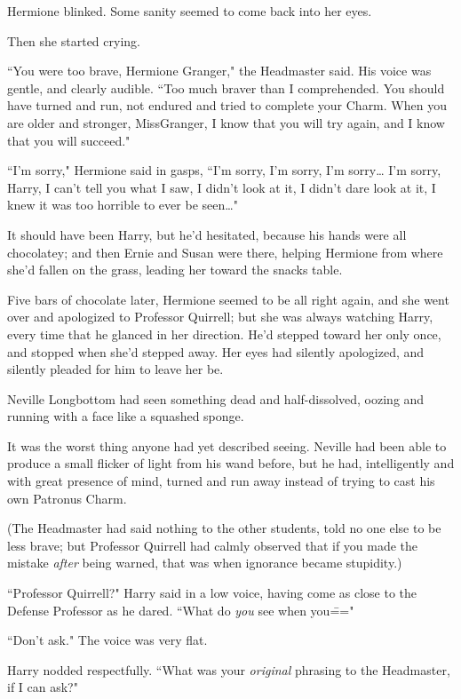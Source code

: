 Hermione blinked. Some sanity seemed to come back into her eyes.

Then she started crying.

``You were too brave, Hermione Granger," the Headmaster said. His voice was gentle, and clearly audible. ``Too much braver than I comprehended. You should have turned and run, not endured and tried to complete your Charm. When you are older and stronger, Miss\?Granger, I know that you will try again, and I know that you will succeed."

``I'm sorry," Hermione said in gasps, ``I'm sorry, I'm sorry, I'm sorry{\ldots} I'm sorry, Harry, I can't tell you what I saw, I didn't look at it, I didn't dare look at it, I knew it was too horrible to ever be seen{\ldots}"

It should have been Harry, but he'd hesitated, because his hands were all chocolatey; and then Ernie and Susan were there, helping Hermione from where she'd fallen on the grass, leading her toward the snacks table.

Five bars of chocolate later, Hermione seemed to be all right again, and she went over and apologized to Professor Quirrell; but she was always watching Harry, every time that he glanced in her direction. He'd stepped toward her only once, and stopped when she'd stepped away. Her eyes had silently apologized, and silently pleaded for him to leave her be.

\later

Neville Longbottom had seen something dead and half-dissolved, oozing and running with a face like a squashed sponge.

It was the worst thing anyone had yet described seeing. Neville had been able to produce a small flicker of light from his wand before, but he had, intelligently and with great presence of mind, turned and run away instead of trying to cast his own Patronus Charm.

(The Headmaster had said nothing to the other students, told no one else to be less brave; but Professor Quirrell had calmly observed that if you made the mistake \emph{after} being warned, that was when ignorance became stupidity.)

``Professor Quirrell?" Harry said in a low voice, having come as close to the Defense Professor as he dared. ``What do \emph{you} see when you\==="

``Don't ask." The voice was very flat.

Harry nodded respectfully. ``What was your \emph{original} phrasing to the Headmaster, if I can ask?"


